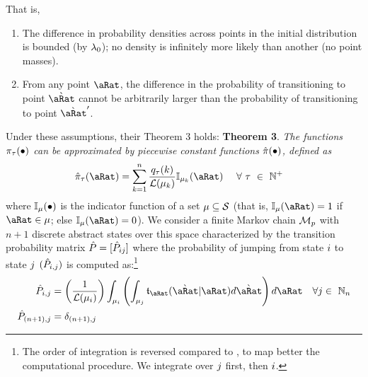 \documentclass[\econtexRoot/BufferStockTheory.tex]{subfiles}
\begin{document}
  That is,
  \begin{enumerate}
  \item The difference in probability densities across points in the initial distribution is bounded (by $\lambda_{0}$); no density is infinitely more likely than another (no point masses).
    \item From any point $\pnt$, the difference in the probability of transitioning to point $\Nxt{\pnt}$ cannot be arbitrarily larger than the probability of transitioning to point $\Nxt{\pnt}^{\prime}$.  
  \end{enumerate}
Under these assumptions, their Theorem 3 holds:
\textbf{Theorem 3}. \textit{The functions $\pi_{\tau}(\bullet)$ can  be approximated by piecewise constant functions $\hat{\pi}(\bullet)$, defined as}
\begin{align}\label{eq:PrbBinNxtFmPntNow}
  \DnsPntAprx_{\tAbs}(\pnt) &= \sum_{\LoopC=1}^{\NumAprxStes} \frac{\pmfBinNow_{\tAbs}(\LoopC)}{\Lebes(\SetPartCnts_{\LoopC})} \mathbb{I}_{\SetPartCnts_{\LoopC}}(\pnt)~~~~\forall~\tAbs~\in~\Nteger^{+}
\end{align}where $\mathbb{I}_{\mu}(\bullet)$ is the indicator function of a set $\mu \subseteq \mathcal{S}$ (that is, $\mathbb{I}_{\SetPartCnts}(\pnt) = 1$ if $\pnt \in \SetPartCnts$; else $\mathbb{I}_{\SetPartCnts}(\pnt) = 0$).  %
We consider a finite Markov chain $\mathcal{M}_{p}$ with $n+1$ discrete abstract states over this space characterized by the transition probability matrix $\hat{P} = [\hat{P}_{ij}]$ where the probability of jumping from state $i$ to state $j$ $(\hat{P}_{i,j})$ is computed as:\footnote{The order of integration is reversed compared to \cite{saDiscrete}, to map better the computational procedure.  We integrate over $j$ first, then $i$.}
\begin{align}
  \TnsMrkv_{\thisBin,\thatBin} &= \left(\frac{1}{\Lebes(\SetPartCnts_{\thisBin})}\right)\int_{\SetPartCnts_{\thisBin}}\left(\int_{\SetPartCnts_{\thatBin}}\DnsPntNxtFmPntNow_{\pnt}(\Nxt{\pnt}|\pnt){d\Nxt{\pnt}}\right){d\pnt}~~~\forall\thatBin \in~ \Nteger_{\NumAprxStes} \label{eq:thisTOthat}
  \\ \TnsMrkv_{\NumAprxStesPls,\thatBin} &= \delta_{\NumAprxStesPls,\thatBin}\notag
\end{align}
\end{document}
